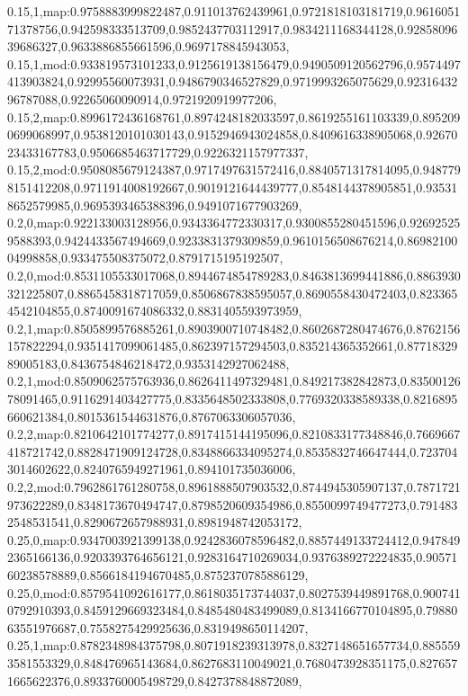 0.15,1,map:0.9758883999822487,0.911013762439961,0.9721818103181719,0.961605171378756,0.942598333513709,0.9852437703112917,0.9834211168344128,0.9285809639686327,0.9633886855661596,0.9697178845943053,
0.15,1,mod:0.933819573101233,0.9125619138156479,0.9490509120562796,0.9574497413903824,0.92995560073931,0.9486790346527829,0.9719993265075629,0.9231643296787088,0.92265060090914,0.9721920919977206,
0.15,2,map:0.8996172436168761,0.8974248182033597,0.8619255161103339,0.8952090699068997,0.9538120101030143,0.9152946943024858,0.8409616338905068,0.9267023433167783,0.9506685463717729,0.9226321157977337,
0.15,2,mod:0.9508085679124387,0.9717497631572416,0.8840571317814095,0.9487798151412208,0.9711914008192667,0.9019121644439777,0.8548144378905851,0.935318652579985,0.9695393465388396,0.9491071677903269,
0.2,0,map:0.922133003128956,0.9343364772330317,0.9300855280451596,0.926925259588393,0.9424433567494669,0.9233831379309859,0.9610156508676214,0.8698210004998858,0.933475508375072,0.8791715195192507,
0.2,0,mod:0.8531105533017068,0.8944674854789283,0.8463813699441886,0.8863930321225807,0.8865458318717059,0.8506867838595057,0.8690558430472403,0.8233654542104855,0.8740091674086332,0.8831405593973959,
0.2,1,map:0.8505899576885261,0.8903900710748482,0.8602687280474676,0.8762156157822294,0.9351417099061485,0.862397157294503,0.835214365352661,0.8771832989005183,0.8436754846218472,0.9353142927062488,
0.2,1,mod:0.8509062575763936,0.8626411497329481,0.849217382842873,0.8350012678091465,0.9116291403427775,0.8335648502333808,0.7769320338589338,0.8216895660621384,0.8015361544631876,0.8767063306057036,
0.2,2,map:0.8210642101774277,0.8917415144195096,0.8210833177348846,0.7669667418721742,0.8828471909124728,0.8348866334095274,0.8535832746647444,0.7237043014602622,0.8240765949271961,0.894101735036006,
0.2,2,mod:0.7962861761280758,0.8961888507903532,0.8744945305907137,0.7871721973622289,0.8348173670494747,0.8798520609354986,0.8550099749477273,0.7914832548531541,0.8290672657988931,0.8981948742053172,
0.25,0,map:0.9347003921399138,0.9242836078596482,0.8857449133724412,0.9478492365166136,0.9203393764656121,0.9283164710269034,0.9376389272224835,0.9057160238578889,0.8566184194670485,0.8752370785886129,
0.25,0,mod:0.8579541092616177,0.8618035173744037,0.8027539449891768,0.9007410792910393,0.8459129669323484,0.8485480483499089,0.8134166770104895,0.7988063551976687,0.7558275429925636,0.8319498650114207,
0.25,1,map:0.8782348984375798,0.8071918239313978,0.8327148651657734,0.8855593581553329,0.848476965143684,0.8627683110049021,0.7680473928351175,0.8276571665622376,0.8933760005498729,0.8427378848872089,
